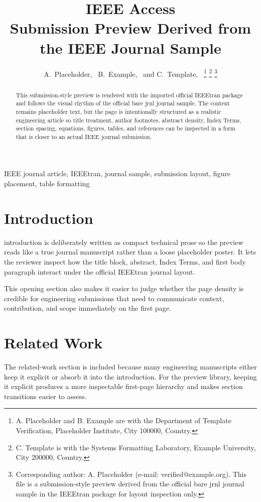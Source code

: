 \documentclass[journal]{IEEEtran}
\title{IEEE Access\\\large Submission Preview Derived from the IEEE Journal Sample}
\author{A.~Placeholder,~\IEEEmembership{Member,~IEEE,}%
B.~Example,~\IEEEmembership{Senior Member,~IEEE,}%
and C.~Template,~\IEEEmembership{Member,~IEEE}%
\thanks{A. Placeholder and B. Example are with the Department of Template Verification, Placeholder Institute, City 100000, Country.}%
\thanks{C. Template is with the Systems Formatting Laboratory, Example University, City 200000, Country.}%
\thanks{Corresponding author: A. Placeholder (e-mail: verified@example.org). This file is a submission-style preview derived from the official bare jrnl journal sample in the IEEEtran package for layout inspection only.}}
\begin{document}
\maketitle
\begin{abstract}
This submission-style preview is rendered with the imported official IEEEtran package and follows the visual rhythm of the official bare jrnl journal sample. The content remains placeholder text, but the page is intentionally structured as a realistic engineering article so title treatment, author footnotes, abstract density, Index Terms, section spacing, equations, figures, tables, and references can be inspected in a form that is closer to an actual IEEE journal submission.
\end{abstract}
\begin{IEEEkeywords}
IEEE journal article, IEEEtran, journal sample, submission layout, figure placement, table formatting
\end{IEEEkeywords}
\section{Introduction}
 introduction is deliberately written as compact technical prose so the preview reads like a true journal manuscript rather than a loose placeholder poster. It lets the reviewer inspect how the title block, abstract, Index Terms, and first body paragraph interact under the official IEEEtran journal layout.

This opening section also makes it easier to judge whether the page density is credible for engineering submissions that need to communicate context, contribution, and scope immediately on the first page.
\section{Related Work}
The related-work section is included because many engineering manuscripts either keep it explicit or absorb it into the introduction. For the preview library, keeping it explicit produces a more inspectable first-page hierarchy and makes section transitions easier to assess.
\end{document}

